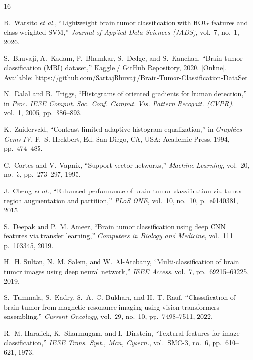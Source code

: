 \documentclass[conference]{IEEEtran}
\begin{document}
\begin{thebibliography}{16}

B.~Warsito \emph{et al.}, ``Lightweight brain tumor classification with HOG features and class-weighted SVM,'' \emph{Journal of Applied Data Sciences (JADS)}, vol.~7, no.~1, 2026.

S.~Bhuvaji, A.~Kadam, P.~Bhumkar, S.~Dedge, and S.~Kanchan, ``Brain tumor classification (MRI) dataset,'' Kaggle / GitHub Repository, 2020. [Online]. Available: \url{https://github.com/SartajBhuvaji/Brain-Tumor-Classification-DataSet}

N.~Dalal and B.~Triggs, ``Histograms of oriented gradients for human detection,'' in \emph{Proc. IEEE Comput. Soc. Conf. Comput. Vis. Pattern Recognit. (CVPR)}, vol.~1, 2005, pp.~886--893.

K.~Zuiderveld, ``Contrast limited adaptive histogram equalization,'' in \emph{Graphics Gems IV}, P.~S. Heckbert, Ed. San Diego, CA, USA: Academic Press, 1994, pp.~474--485.

C.~Cortes and V.~Vapnik, ``Support-vector networks,'' \emph{Machine Learning}, vol.~20, no.~3, pp.~273--297, 1995.

J.~Cheng \emph{et al.}, ``Enhanced performance of brain tumor classification via tumor region augmentation and partition,'' \emph{PLoS ONE}, vol.~10, no.~10, p.~e0140381, 2015.

S.~Deepak and P.~M. Ameer, ``Brain tumor classification using deep CNN features via transfer learning,'' \emph{Computers in Biology and Medicine}, vol.~111, p.~103345, 2019.

H.~H. Sultan, N.~M. Salem, and W.~Al-Atabany, ``Multi-classification of brain tumor images using deep neural network,'' \emph{IEEE Access}, vol.~7, pp.~69215--69225, 2019.

S.~Tummala, S.~Kadry, S.~A.~C. Bukhari, and H.~T. Rauf, ``Classification of brain tumor from magnetic resonance imaging using vision transformers ensembling,'' \emph{Current Oncology}, vol.~29, no.~10, pp.~7498--7511, 2022.

R.~M. Haralick, K.~Shanmugam, and I.~Dinstein, ``Textural features for image classification,'' \emph{IEEE Trans. Syst., Man, Cybern.}, vol.~SMC-3, no.~6, pp.~610--621, 1973.


\end{thebibliography}
\end{document}

